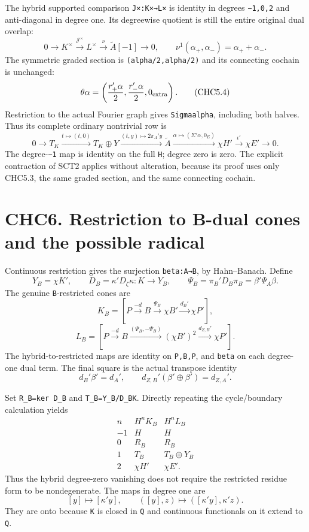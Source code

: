 The hybrid supported comparison \texttt{J×:K×→L×} is identity in degrees
\texttt{−1,0,2} and anti-diagonal in degree one. Its degreewise quotient
is still the entire original dual overlap: \[
0\to K^\times\xrightarrow{\mathcal J^\times}L^\times
\xrightarrow{\nu}\widetilde A[-1]\to0,
\qquad \nu^1(\alpha_+,\alpha_-)=\alpha_++\alpha_-.
\tag{CHC5.3}
\] The symmetric graded section is \texttt{(alpha/2,alpha/2)} and its
connecting cochain is unchanged: \[
\theta\alpha=
\left(\frac{r_+'\alpha}{2},\frac{r_-'\alpha}{2},0_{\rm extra}\right).
\tag{CHC5.4}
\] Restriction to the actual Fourier graph gives
\texttt{Sigma\textquotesingle{}alpha}, including both halves. Thus its
complete ordinary nontrivial row is \[
0\to T_K\xrightarrow{t\mapsto(t,0)}T_K\oplus Y
\xrightarrow{(t,y)\mapsto2\pi_A'y}\widetilde A
\xrightarrow{\alpha\mapsto(\Sigma'\alpha,0_E)}\chi H'
\xrightarrow{\iota'}\chi E'\to0.
\tag{CHC5.5}
\] The degree-\texttt{−1} map is identity on the full \texttt{H}; degree
zero is zero. The explicit contraction of SCT2 applies without
alteration, because its proof uses only CHC5.3, the same graded section,
and the same connecting cochain.

\section{CHC6. Restriction to B-dual cones and the possible
radical}\label{chc6.-restriction-to-b-dual-cones-and-the-possible-radical}

Continuous restriction gives the surjection
\texttt{beta\textquotesingle{}:A\textquotesingle{}→B\textquotesingle{}},
by Hahn--Banach. Define \[
Y_B=\chi K',\qquad
D_B=\kappa'D_\zeta\kappa:K\to Y_B,
\qquad
\Psi_B=\pi_B'D_B\pi_B=\beta'\Psi_A\beta.
\] The genuine \texttt{B}-restricted cones are \[
K_B=[P\xrightarrow{-d}B\xrightarrow{\Psi_B}\chi B'
\xrightarrow{d_B'}\chi P'],
\] \[
L_B=[P\xrightarrow{-d}B\xrightarrow{(\Psi_B,-\Psi_B)}(\chi B')^2
\xrightarrow{d_{Z,B}'}\chi P'].
\tag{CHC6.1}
\] The hybrid-to-restricted maps are identity on
\texttt{P,B,P\textquotesingle{}}, and \texttt{beta\textquotesingle{}} on
each degree-one dual term. The final square is the actual transpose
identity \[
d_B'\beta'=d_A',\qquad
d_{Z,B}'(\beta'\oplus\beta')=d_{Z,A}'.
\]

Set \texttt{R\_B=ker\ D\_B} and \texttt{T\_B=Y\_B/D\_BK}. Directly
repeating the cycle/boundary calculation yields \[
\begin{array}{c|cc}
n&H^nK_B&H^nL_B\\\hline
-1&H&H\\
0&R_B&R_B\\
1&T_B&T_B\oplus Y_B\\
2&\chi H'&\chi E'.
\end{array}
\tag{CHC6.2}
\] Thus the hybrid degree-zero vanishing does not require the restricted
residue form to be nondegenerate. The maps in degree one are \[
[y]\longmapsto[\kappa'y],\qquad
([y],z)\longmapsto([\kappa'y],\kappa'z).
\tag{CHC6.3}
\] They are onto because \texttt{K} is closed in \texttt{Q} and
continuous functionals on it extend to \texttt{Q}.

